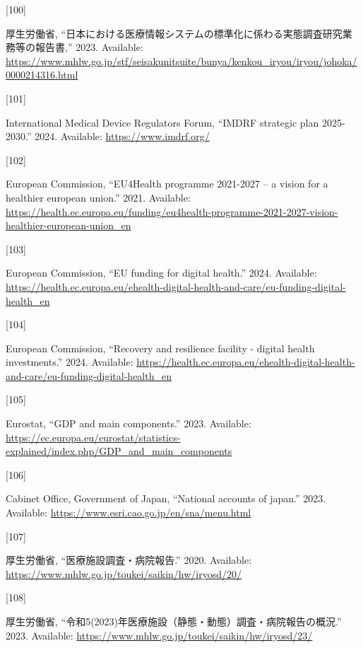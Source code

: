 \documentclass[
  a4paper,
  a4paper,
  11pt]{ltjsbook}
\newlength{\cslhangindent}
\newlength{\csllabelwidth}
\newenvironment{CSLReferences}[2] %
 {\begin{list}{}{%
  \setlength{\itemindent}{0pt}
  \setlength{\leftmargin}{0pt}
  \setlength{\parsep}{0pt}
  \ifodd #1
   \setlength{\leftmargin}{\cslhangindent}
   \setlength{\itemindent}{-1\cslhangindent}
  \fi
  \setlength{\itemsep}{#2\baselineskip}}}
 {\end{list}}
\newcommand{\CSLLeftMargin}[1]{\parbox[t]{\csllabelwidth}{\strut#1\strut}}
\newcommand{\CSLRightInline}[1]{\parbox[t]{\linewidth - \csllabelwidth}{\strut#1\strut}}
\begin{document}
\begin{CSLReferences}{0}{0}
\CSLLeftMargin{{[}100{]} }%
\CSLRightInline{厚生労働省,
{``日本における医療情報システムの標準化に係わる実態調査研究業務等の報告書,''}
2023. Available:
\url{https://www.mhlw.go.jp/stf/seisakunitsuite/bunya/kenkou_iryou/iryou/johoka/0000214316.html}}

\CSLLeftMargin{{[}101{]} }%
\CSLRightInline{International Medical Device Regulators Forum, {``IMDRF
strategic plan 2025-2030.''} 2024. Available:
\url{https://www.imdrf.org/}}

\CSLLeftMargin{{[}102{]} }%
\CSLRightInline{European Commission, {``EU4Health programme 2021-2027 --
a vision for a healthier european union.''} 2021. Available:
\url{https://health.ec.europa.eu/funding/eu4health-programme-2021-2027-vision-healthier-european-union_en}}

\CSLLeftMargin{{[}103{]} }%
\CSLRightInline{European Commission, {``EU funding for digital
health.''} 2024. Available:
\url{https://health.ec.europa.eu/ehealth-digital-health-and-care/eu-funding-digital-health_en}}

\CSLLeftMargin{{[}104{]} }%
\CSLRightInline{European Commission, {``Recovery and resilience facility
- digital health investments.''} 2024. Available:
\url{https://health.ec.europa.eu/ehealth-digital-health-and-care/eu-funding-digital-health_en}}

\CSLLeftMargin{{[}105{]} }%
\CSLRightInline{Eurostat, {``GDP and main components.''} 2023.
Available:
\url{https://ec.europa.eu/eurostat/statistics-explained/index.php/GDP_and_main_components}}

\CSLLeftMargin{{[}106{]} }%
\CSLRightInline{Cabinet Office, Government of Japan, {``National
accounts of japan.''} 2023. Available:
\url{https://www.esri.cao.go.jp/en/sna/menu.html}}

\CSLLeftMargin{{[}107{]} }%
\CSLRightInline{厚生労働省, {``医療施設調査・病院報告.''} 2020.
Available: \url{https://www.mhlw.go.jp/toukei/saikin/hw/iryosd/20/}}

\CSLLeftMargin{{[}108{]} }%
\CSLRightInline{厚生労働省,
{``令和5(2023)年医療施設（静態・動態）調査・病院報告の概況.''} 2023.
Available: \url{https://www.mhlw.go.jp/toukei/saikin/hw/iryosd/23/}}


\end{CSLReferences}
\end{document}
